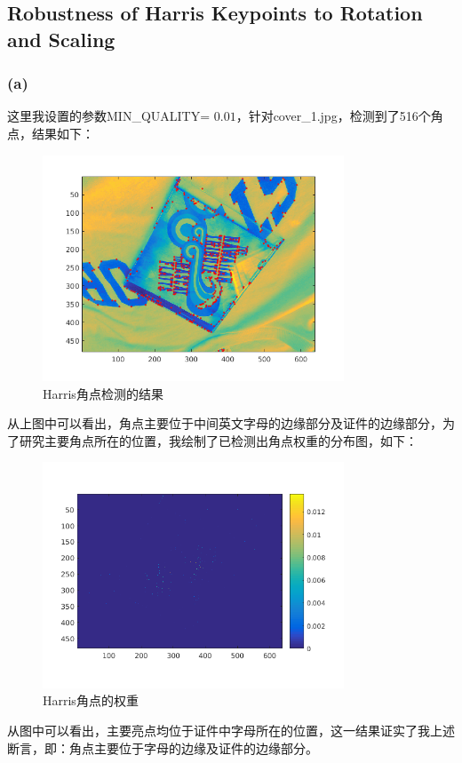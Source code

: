\documentclass[a4paper, UTF8]{ctexrep}
\begin{document}
		\subsection{Robustness of Harris Keypoints to Rotation and Scaling}
			\subsubsection{(a)}
				这里我设置的参数MIN\_QUALITY= $0.01$，针对cover\_1.jpg，检测到了516个角点，结果如下：
				\begin{figure}[htbp!]
					\centering
					\includegraphics[width=0.8\textwidth]{hw1_fig1.png}
					\caption{Harris角点检测的结果}
				\end{figure}
				从上图中可以看出，角点主要位于中间英文字母的边缘部分及证件的边缘部分，为了研究主要角点所在的位置，我绘制了已检测出角点权重的分布图，如下：
				\clearpage
				\begin{figure}[htbp!]
					\centering
					\includegraphics[width=0.8\textwidth]{hw1_fig2.png}
					\caption{Harris角点的权重}
				\end{figure}
				从图中可以看出，主要亮点均位于证件中字母所在的位置，这一结果证实了我上述断言，即：角点主要位于字母的边缘及证件的边缘部分。
			\clearpage
\end{document}
